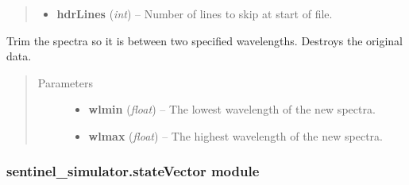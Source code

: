 \documentclass[letterpaper,10pt,english]{sphinxmanual}
\begin{document}
\begin{fulllineitems}
\begin{fulllineitems}
\begin{quote}
\begin{description}
\begin{itemize}
\item {} 
\textbf{hdrLines} (\emph{int}) -- Number of lines to skip at start of file.

\end{itemize}

\end{description}\end{quote}

\end{fulllineitems}


\begin{fulllineitems}
\label{source/sentinel_simulator:sentinel_simulator.spectra.spectra.trim}
Trim the spectra so it is between two specified wavelengths. Destroys the original data.
\begin{quote}\begin{description}
\item[{Parameters}] \leavevmode\begin{itemize}
\item {} 
\textbf{wlmin} (\emph{float}) -- The lowest wavelength of the new spectra.

\item {} 
\textbf{wlmax} (\emph{float}) -- The highest wavelength of the new spectra.

\end{itemize}

\end{description}\end{quote}

\end{fulllineitems}


\end{fulllineitems}



\subsubsection{sentinel\_simulator.stateVector module}
\label{source/sentinel_simulator:module-sentinel_simulator.stateVector}\label{source/sentinel_simulator:sentinel-simulator-statevector-module}
\end{document}
